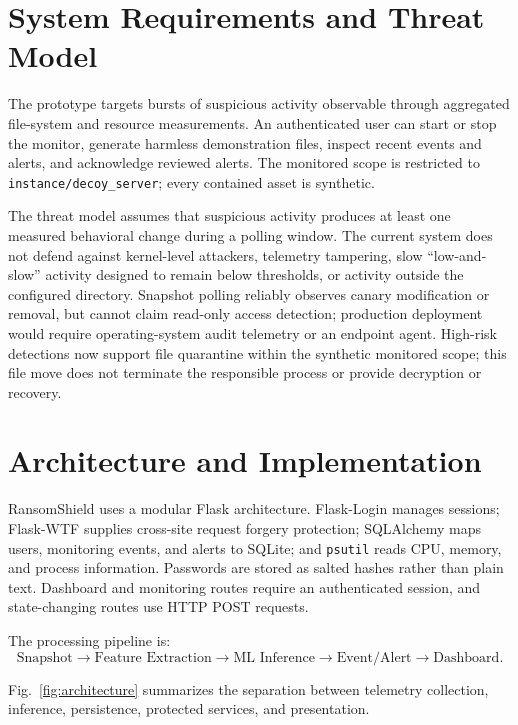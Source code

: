 \documentclass[conference]{IEEEtran}
\begin{document}
\section{System Requirements and Threat Model}
The prototype targets bursts of suspicious activity observable through aggregated
file-system and resource measurements. An authenticated user can start or stop
the monitor, generate harmless demonstration files, inspect recent events and
alerts, and acknowledge reviewed alerts. The monitored scope is restricted to
\texttt{instance/decoy\_server}; every contained asset is synthetic.

The threat model assumes that suspicious activity produces at least one measured
behavioral change during a polling window. The current system does not defend
against kernel-level attackers, telemetry tampering, slow ``low-and-slow''
activity designed to remain below thresholds, or activity outside the configured
directory. Snapshot polling reliably observes canary modification or removal,
but cannot claim read-only access detection; production deployment would require
operating-system audit telemetry or an endpoint agent. High-risk detections now
support file quarantine within the synthetic monitored scope; this file move does
not terminate the responsible process or provide decryption or recovery.

\section{Architecture and Implementation}
RansomShield uses a modular Flask architecture. Flask-Login manages sessions;
Flask-WTF supplies cross-site request forgery protection; SQLAlchemy maps users,
monitoring events, and alerts to SQLite; and \texttt{psutil} reads CPU, memory,
and process information. Passwords are stored as salted hashes rather than plain
text. Dashboard and monitoring routes require an authenticated session, and
state-changing routes use HTTP POST requests.

The processing pipeline is:
\begin{equation}
\text{Snapshot} \rightarrow \text{Feature Extraction} \rightarrow
\text{ML Inference} \rightarrow \text{Event/Alert} \rightarrow \text{Dashboard}.
\end{equation}

Fig.~\ref{fig:architecture} summarizes the separation between telemetry
collection, inference, persistence, protected services, and presentation.
\end{document}
